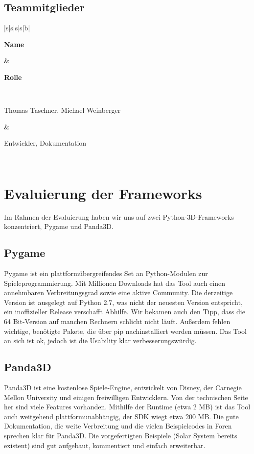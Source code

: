 \documentclass[12pt,a4paper,oneside,ngerman]{scrartcl}
\newcommand{\tabhvent}[1]{\noindent\parbox[c]{\hsize}{#1}}
\begin{document}
\subsection{Teammitglieder}
\begin{table}[h]
\renewcommand{\arraystretch}{3.0}
\centering
\begin{tabularx}{\textwidth}{|s|s|s|s|b|}
\hline


\tabhvent{\textbf{Name}} &\tabhvent{\textbf{Rolle}}  \\ \hline

\tabhvent{Thomas Taschner, Michael Weinberger} & \tabhvent{Entwickler, Dokumentation} \\ \hline


\end{tabularx}
\end{table}

\section{Evaluierung der Frameworks}
Im Rahmen der Evaluierung haben wir uns auf zwei Python-3D-Frameworks konzentriert, Pygame und Panda3D.
\subsection{Pygame}
Pygame ist ein plattformübergreifendes Set an Python-Modulen zur Spieleprogrammierung. Mit Millionen Downloads hat das Tool auch einen annehmbaren Verbreitungsgrad sowie eine aktive Community. Die derzeitige Version ist ausgelegt auf Python 2.7, was nicht der neuesten Version entspricht, ein inoffizieller Release verschafft Abhilfe. Wir bekamen auch den Tipp, dass die 64 Bit-Version auf manchen Rechnern schlicht nicht läuft. Außerdem fehlen wichtige, benötigte Pakete, die über pip nachinstalliert werden müssen. Das Tool an sich ist ok, jedoch ist die Usability klar verbesserungswürdig.

\subsection{Panda3D}
Panda3D ist eine kostenlose Spiele-Engine, entwickelt von Disney, der Carnegie Mellon University und einigen freiwilligen Entwicklern. Von der technischen Seite her sind viele Features vorhanden. Mithilfe der Runtime (etwa 2 MB) ist das Tool auch weitgehend plattformunabhängig, der SDK wiegt etwa 200 MB. Die gute Dokumentation, die weite Verbreitung und die vielen Beispielcodes in Foren sprechen klar für Panda3D. Die vorgefertigten Beispiele (Solar System bereits existent) sind gut aufgebaut, kommentiert und einfach erweiterbar.
\end{document}
